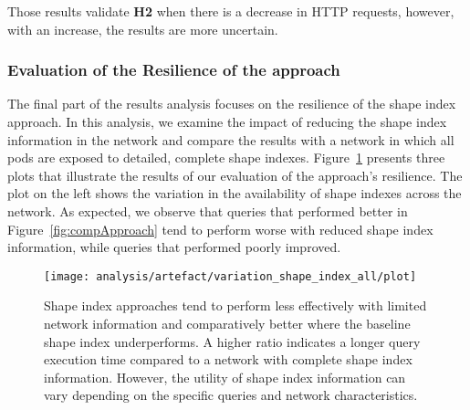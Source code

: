 Those results validate \textbf{H2} when there is a decrease in HTTP requests, however, with an increase, the results are more uncertain.

\fi


\subsubsection{Evaluation of the Resilience of the approach}

The final part of the results analysis focuses on the resilience of the shape index approach.
In this analysis, we examine the impact of reducing the shape index information in the network and compare the results with a network in which all pods are exposed to detailed, complete shape indexes.
Figure~\ref{fig:adaptShapeIndex} presents three plots that illustrate the results of our evaluation of the approach's resilience.
The plot on the left shows the variation in the availability of shape indexes across the network. 
As expected, we observe that queries that performed better in Figure~\ref{fig:compApproach} tend to perform worse with reduced shape index information, while queries that performed poorly improved. 


\begin{figure}
    \centering
    \texttt{[image: analysis/artefact/variation\_shape\_index\_all/plot]}
    \caption{
    Shape index approaches tend to perform less effectively with limited network information and comparatively better where the baseline shape index underperforms.
    A higher ratio indicates a longer query execution time compared to a network with complete shape index information.
    However, the utility of shape index information can vary depending on the specific queries and network characteristics.
    }
    \label{fig:adaptShapeIndex}
\end{figure}


